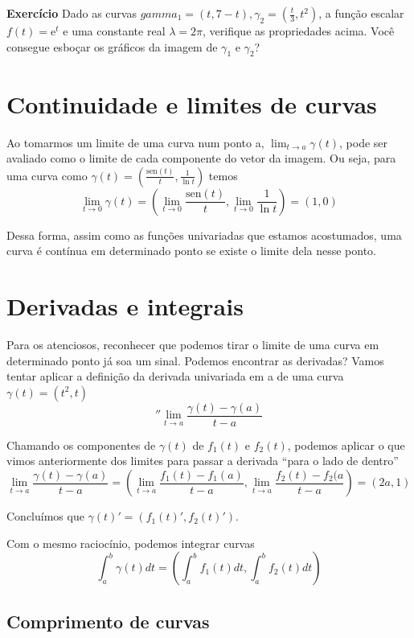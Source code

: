 \documentclass[
  letterpaper,
  DIV=11,
  numbers=noendperiod]{scrreprt}
\begin{document}
\textbf{Exercício} Dado as curvas
\(gamma_{1} = (t, 7 - t), \gamma_{2} = \left(\frac{t}{3}, t^2\right)\),
a função escalar \(f(t) = \mathrm{e}^t\) e uma constante real
\(\lambda = 2\pi\), verifique as propriedades acima. Você consegue
esboçar os gráficos da imagem de \(\gamma_{1}\) e \(\gamma_{2}\)?

\section{Continuidade e limites de
curvas}\label{continuidade-e-limites-de-curvas}

Ao tomarmos um limite de uma curva num ponto a,
\(\lim_{t\rightarrow a} \gamma(t)\), pode ser avaliado como o limite de
cada componente do vetor da imagem. Ou seja, para uma curva como
\(\gamma(t) = \left(\frac{\mathrm{sen}(t)}{t}, \frac{1}{\ln{t}}\right)\)
temos \[
\lim_{t\rightarrow 0}\gamma(t) = \left(\lim_{t\rightarrow 0} \frac{\mathrm{sen}(t)}{t}, 
\lim_{t\rightarrow 0} \frac{1}{\ln{t}}\right)  = (1, 0)
\]

Dessa forma, assim como as funções univariadas que estamos acostumados,
uma curva é contínua em determinado ponto se existe o limite dela nesse
ponto.

\section{Derivadas e integrais}\label{derivadas-e-integrais}

Para os atenciosos, reconhecer que podemos tirar o limite de uma curva
em determinado ponto já soa um sinal. Podemos encontrar as derivadas?
Vamos tentar aplicar a definição da derivada univariada em a de uma
curva \(\gamma(t) = (t^2, t)\) \[''
\lim_{t\rightarrow a} \frac{\gamma(t)-\gamma(a)}{t-a}
\]

Chamando os componentes de \(\gamma(t)\) de \(f_{1}(t)\) e \(f_{2}(t)\),
podemos aplicar o que vimos anteriormente dos limites para passar a
derivada ``para o lado de dentro'' \[
\lim_{t\rightarrow a} \frac{\gamma(t) - \gamma(a)}{t-a} = \left(\lim_{t \rightarrow a} \frac{f_{1}(t) - f_{1}(a)}{t-a},
\lim_{t \rightarrow a}\frac{f_{2}(t)-f_{2}(a}{t-a} \right) = (2a, 1)
\]

Concluímos que \(\gamma(t)' = (f_{1}(t)', f_{2}(t)')\).

Com o mesmo raciocínio, podemos integrar curvas \[
\int_{a}^{b} \gamma(t)dt = \left(\int_{a}^{b} f_{1}(t)dt, \int_{a}^{b}f_{2}(t)dt\right)
\]

\subsection{Comprimento de curvas}\label{comprimento-de-curvas}
\end{document}
